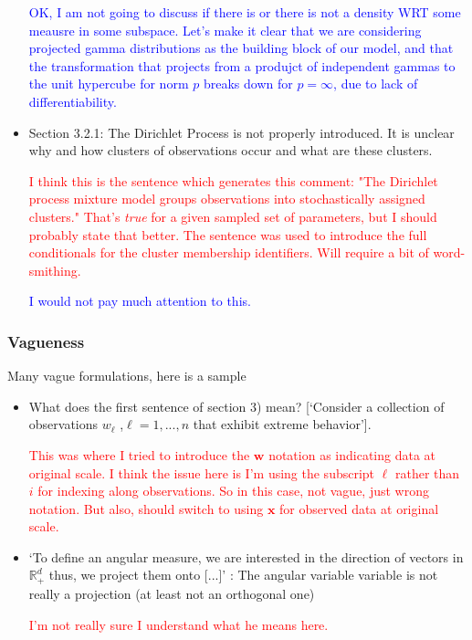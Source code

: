 \documentclass[10pt]{article}
\newcommand{\bruno}[1]{\textcolor{blue}{#1}} %
\newcommand{\peter}[1]{\textcolor{red}{#1}}  %
\begin{document}
\begin{itemize}
    \bruno{OK, I am not going to discuss if there is or there is not a density WRT some meausre in some subspace. Let's make it clear that we are considering projected gamma distributions as the building block of our model, and that the transformation that projects from a produjct of independent gammas to the unit hypercube for norm $p$ breaks down for $p=\infty$, due to lack of differentiability. }
    \item Section 3.2.1: The Dirichlet Process is not properly introduced. It is unclear why and how clusters of observations occur and what are these clusters.
    
    \peter{I think this is the sentence which generates this comment: "The Dirichlet process mixture model groups observations into stochastically assigned clusters."  That's \emph{true} for a given sampled set of parameters, but I should probably state that better.  The sentence was used to introduce the full conditionals for the cluster membership identifiers.  Will require a bit of word-smithing.}
    
    \bruno{I would not pay much attention to this.}
    
\end{itemize}
\subsubsection*{Vagueness}
 Many vague formulations, here is a sample
\begin{itemize}
    \item What does the first sentence of section 3) mean? [‘Consider a collection of observations $w_{\ell}$ ,$\ell = 1,...,n$ that exhibit extreme behavior’].
    
    \peter{This was where I tried to introduce the $\bm{w}$ notation as indicating data at original scale.  I think the issue here is I'm using the subscript $\ell$ rather than $i$ for indexing along observations.  So in this case,  not vague, just wrong notation.  But also, should switch to using $\bm{x}$ for observed data at original scale.}
    
    \item  ‘To define an angular measure, we are interested in the direction of vectors in ${\mathbb R}_+^d$ thus, we project them onto [...]’ : The angular variable variable is not really a projection (at least not an orthogonal one)
    
    \peter{I'm not really sure I understand what he means here.}
\end{itemize}
\end{document}
